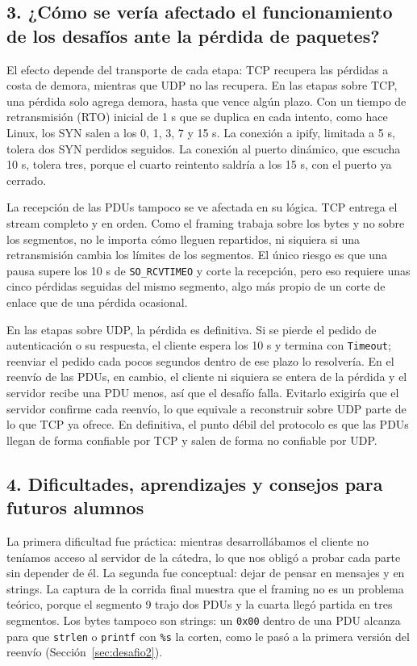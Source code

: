 \documentclass[11pt,a4paper]{article}
\newcommand{\code}[1]{\texttt{#1}}
\begin{document}
\subsection*{3. ¿Cómo se vería afectado el funcionamiento de los desafíos ante la pérdida de paquetes?}

El efecto depende del transporte de cada etapa: TCP recupera las pérdidas a costa de demora, mientras que UDP no las
recupera. En las etapas sobre TCP, una pérdida solo agrega demora, hasta que vence algún plazo. Con un tiempo de
retransmisión (RTO) inicial de 1 s que se duplica en cada intento, como hace Linux, los SYN salen a los 0, 1, 3, 7 y
15 s. La conexión a ipify, limitada a 5 s, tolera dos SYN perdidos seguidos. La conexión al puerto dinámico, que
escucha 10 s, tolera tres, porque el cuarto reintento saldría a los 15 s, con el puerto ya cerrado.

La recepción de las PDUs tampoco se ve afectada en su lógica. TCP entrega el stream completo y en orden. Como el
framing trabaja sobre los bytes y no sobre los segmentos, no le importa cómo lleguen repartidos, ni siquiera si una
retransmisión cambia los límites de los segmentos. El único riesgo es que una pausa supere los 10 s de
\code{SO\_RCVTIMEO} y corte la recepción, pero eso requiere unas cinco pérdidas seguidas del mismo segmento, algo
más propio de un corte de enlace que de una pérdida ocasional.

En las etapas sobre UDP, la pérdida es definitiva. Si se pierde el pedido de autenticación o su respuesta, el cliente
espera los 10 s y termina con \code{Timeout}; reenviar el pedido cada pocos segundos dentro de ese plazo lo
resolvería. En el reenvío de las PDUs, en cambio, el cliente ni siquiera se entera de la pérdida y el servidor recibe
una PDU menos, así que el desafío falla. Evitarlo exigiría que el servidor confirme cada reenvío, lo que equivale a
reconstruir sobre UDP parte de lo que TCP ya ofrece. En definitiva, el punto débil del protocolo es que las PDUs
llegan de forma confiable por TCP y salen de forma no confiable por UDP.

\subsection*{4. Dificultades, aprendizajes y consejos para futuros alumnos}

La primera dificultad fue práctica: mientras desarrollábamos el cliente no teníamos acceso al servidor de la
cátedra, lo que nos obligó a probar cada parte sin depender de él. La segunda
fue conceptual: dejar de pensar en mensajes y en strings. La captura de la corrida final muestra que el framing no
es un problema teórico, porque el segmento 9 trajo dos PDUs y la cuarta llegó partida en tres segmentos. Los bytes
tampoco son strings: un \code{0x00} dentro de una PDU alcanza para que \code{strlen} o \code{printf} con \code{\%s}
la corten, como le pasó a la primera versión del reenvío (Sección~\ref{sec:desafio2}).
\end{document}
